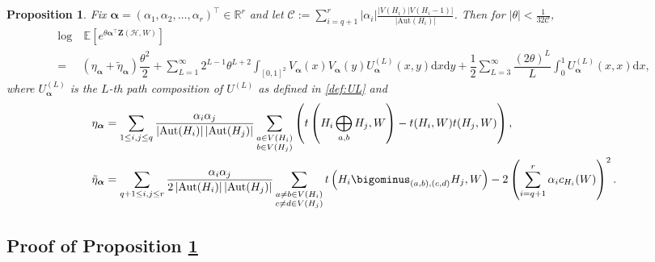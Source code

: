 \documentclass[11pt,reqno]{amsart}
\numberwithin{equation}{section}
\newtheorem{prop}{Proposition}[section]
\theoremstyle{definition}
\begin{document}
\begin{prop}\label{prop:MGF-alpha-limit}
Fix $\bm{\alpha} = (\alpha_1, \alpha_2, \ldots, \alpha_r)^\top \in \mathbb{R}^{r}$ and let $\mathcal{C}:= \sum_{i=q+1}^{r}|\alpha_{i}|\frac{|V(H_{i}) |V(H_{i} - 1 )| }{\left|\text{Aut}(H_{i})\right|}$. Then for $|\theta|<\frac{1}{32\mathcal{C}}$, 
\begin{align*}
    \log&\ \mathbb{E}\left[ e^{\theta \bm{\alpha}^{\top}\bm{Z}(\mathcal{H},W)} \right]\\
    =&\left(  \eta_{\bm \alpha} + \tilde \eta_{\bm \alpha} \right)\dfrac{\theta^{2}}{2} + \sum_{L = 1}^{\infty}2^{L-1} \theta^{L + 2}\int_{[0,1]^{2}}V_{\bm \alpha}(x)V_{\bm \alpha}(y)U_{\bm \alpha}^{(L)}(x,y)\mathrm{d}x\mathrm{d}y + \dfrac{1}{2}\sum_{L=3}^{\infty}\dfrac{(2 \theta)^{L}}{L}\int_{0}^{1} U_{\bm \alpha}^{(L)}(x,x)\mathrm{d}x , 
\end{align*}
where $U_{\bm \alpha}^{(L)}$ is the $L$-th path composition of $U^{(L)}$ as defined in \eqref{def:UL} and 
\begin{align*} 
\eta_{\bm \alpha}  & = \sum_{1 \leq i,j\leq q}\dfrac{\alpha_{i}\alpha_{j}}{\left|\text{Aut}(H_{i})\right|\left|\text{Aut}(H_{j})\right|}\sum_{\substack{a\in V(H_{i})\\ b\in V(H_{j})}}\left(t\left(H
    _{i}\bigoplus_{a,b}H_{j},W\right) - t(H_{i},W)t(H_{j},W)\right) , \nonumber \\
\tilde \eta_{\bm \alpha} & = \sum_{q+1\leq i,j\leq r}\dfrac{\alpha_{i}\alpha_{j}}{2\left|\text{Aut}(H_{i})\right|\left|\text{Aut}(H_{j})\right|}\sum_{\substack{a\neq b\in V(H_{i})\\c\neq d\in V(H_{j})}}t\left(H_{i}\bigominus_{(a,b),(c,d)}H_{j},W\right) - 2\left(\sum_{i=q+1}^{r}\alpha_{i}c_{H_i}(W)\right)^2 . 
\end{align*}  
\end{prop}



\subsection{Proof of Proposition \ref{prop:MGF-alpha-limit}} 
\label{sec:ZHWpf}
\end{document}
